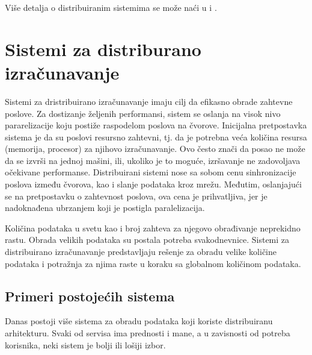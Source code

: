 \documentclass[12pt,oneside]{memoir}
\begin{document}
Više detalja o distribuiranim sistemima se može naći u \cite{ElementsOfDistributedComputing} i \cite{DistributedComputing}.

\section{Sistemi za distriburano izračunavanje}

Sistemi za dristribuirano izračunavanje imaju cilj da efikasno obrade zahtevne poslove. Za dostizanje željenih performansi, sistem se oslanja na visok nivo pararelizacije koju postiže raspodelom poslova na čvorove. Inicijalna pretpostavka sistema je da su poslovi resursno zahtevni, tj. da je potrebna veća količina resursa (memorija, procesor) za njihovo izračunavanje. Ovo često znači da posao ne može da se izvrši na jednoj mašini, ili, ukoliko je to moguće, izršavanje ne zadovoljava očekivane performanse. Distribuirani sistemi nose sa sobom cenu sinhronizacije poslova između čvorova, kao i slanje podataka kroz mrežu. Međutim, oslanjajući se na pretpostavku o zahtevnost poslova, ova cena je prihvatljiva, jer je nadoknađena ubrzanjem koji je postigla paralelizacija.

Količina podataka u svetu kao i broj zahteva za njegovo obrađivanje neprekidno rastu. Obrada velikih podataka su postala potreba svakodnevnice. Sistemi za distribuirano izračunavanje predstavljaju rešenje za obradu velike količine podataka i potražnja za njima raste u koraku sa globalnom količinom podataka.

\subsection{Primeri postojećih sistema}
\label{sub:postojeca_resenja}

Danas postoji više sistema za obradu podataka koji koriste distribuiranu arhitekturu. Svaki od servisa ima prednosti i mane, a u zavisnosti od potreba korisnika, neki sistem je bolji ili lošiji izbor.
\end{document}
